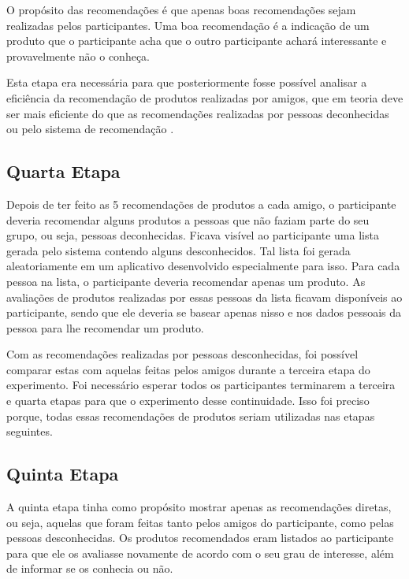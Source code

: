 O propósito das recomendações é que apenas boas recomendações sejam realizadas pelos participantes. Uma boa recomendação é a indicação de um produto que o participante acha que o outro participante achará interessante e provavelmente não o conheça.

Esta etapa era necessária para que posteriormente fosse possível analisar a eficiência da recomendação de produtos realizadas por amigos, que em teoria deve ser mais eficiente do que as recomendações realizadas por pessoas deconhecidas ou pelo sistema de recomendação \cite{bonhard2007devil}.

\subsection{Quarta Etapa}

Depois de ter feito as 5 recomendações de produtos a cada amigo, o participante deveria recomendar alguns produtos a pessoas que não faziam parte do seu grupo, ou seja, pessoas deconhecidas. Ficava visível ao participante uma lista gerada pelo sistema contendo alguns desconhecidos. Tal lista foi gerada aleatoriamente em um aplicativo desenvolvido especialmente para isso. Para cada pessoa na lista, o participante deveria recomendar apenas um produto. As avaliações de produtos realizadas por essas pessoas da lista ficavam disponíveis ao participante, sendo que ele deveria se basear apenas nisso e nos dados pessoais da pessoa para lhe recomendar um produto.


Com as recomendações realizadas por pessoas desconhecidas, foi possível comparar estas com aquelas feitas pelos amigos durante a terceira etapa do experimento. Foi necessário esperar todos os participantes terminarem a terceira e quarta etapas para que o experimento desse continuidade. Isso foi preciso porque, todas essas recomendações de produtos seriam utilizadas nas etapas seguintes.

\subsection{Quinta Etapa}

A quinta etapa tinha como propósito mostrar apenas as recomendações diretas, ou seja, aquelas que foram feitas tanto pelos amigos do participante, como pelas pessoas desconhecidas. Os produtos recomendados eram listados ao participante para que ele os avaliasse novamente de acordo com o seu grau de interesse, além de informar se os conhecia ou não.

